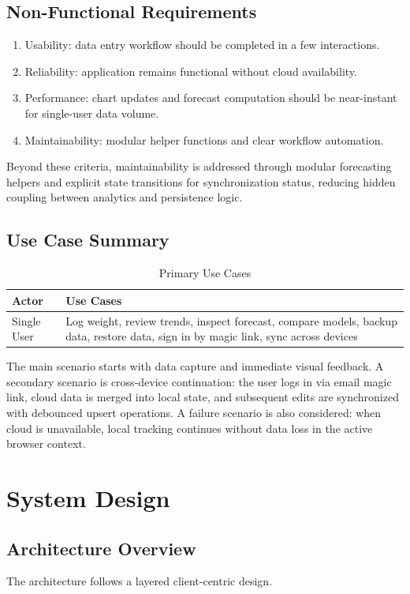 \documentclass[12pt,a4paper]{report}
\begin{document}
\section{Non-Functional Requirements}
\begin{enumerate}[label=NFR\arabic*]
  \item Usability: data entry workflow should be completed in a few interactions.
  \item Reliability: application remains functional without cloud availability.
  \item Performance: chart updates and forecast computation should be near-instant for single-user data volume.
  \item Maintainability: modular helper functions and clear workflow automation.
\end{enumerate}

Beyond these criteria, maintainability is addressed through modular forecasting helpers and explicit state transitions for synchronization status, reducing hidden coupling between analytics and persistence logic.

\section{Use Case Summary}
\begin{table}[H]
\centering
\caption{Primary Use Cases}
\begin{tabular}{p{} p{}}
\toprule
Actor & Use Cases \\
\midrule
Single User & Log weight, review trends, inspect forecast, compare models, backup data, restore data, sign in by magic link, sync across devices \\
\bottomrule
\end{tabular}
\end{table}

The main scenario starts with data capture and immediate visual feedback. A secondary scenario is cross-device continuation: the user logs in via email magic link, cloud data is merged into local state, and subsequent edits are synchronized with debounced upsert operations. A failure scenario is also considered: when cloud is unavailable, local tracking continues without data loss in the active browser context.

\chapter{System Design}
\section{Architecture Overview}
The architecture follows a layered client-centric design.
\end{document}
